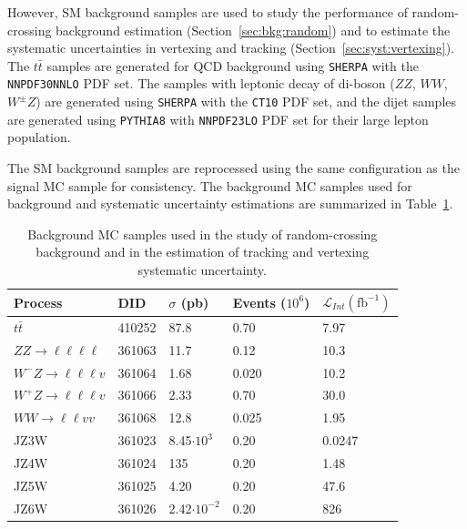 However, SM background samples are used to study the performance of random-crossing background estimation (Section~\ref{sec:bkg:random}) and to estimate the systematic uncertainties in vertexing and tracking (Section~\ref{sec:syst:vertexing}). The $t\bar{t}$ samples are generated for QCD background using \texttt{SHERPA} with the \texttt{NNPDF30NNLO} PDF set. The samples with leptonic decay of di-boson ($ZZ$, $WW$, $W^{\pm}Z$) are generated using \texttt{SHERPA} with the \texttt{CT10} PDF set, and the dijet samples are generated using \texttt{PYTHIA8} with \texttt{NNPDF23LO} PDF set for their large lepton population.

The SM background samples are reprocessed using the same configuration as the signal MC sample for consistency. The background MC samples used for background and systematic uncertainty estimations are summarized in Table~\ref{table:background_MC}.


\begin{table}[!htb]
  \centering
  \begin{tabular}{ l l l l l}
    \hline
    \hline
    Process         &   DID     &   $\sigma$ (pb)       & Events ($10^{6}$) &   $\mathcal{L}_{Int} (\mathrm{fb^{-1}})$ \\
    \hline
    $t\bar{t}$                              &   410252  &   87.8   &   0.70        &   7.97                 \\
    $ZZ\rightarrow \ell \ell \ell \ell$     &   361063  &   11.7   &   0.12        &   10.3                 \\
    $W^{-}Z\rightarrow \ell \ell \ell v$    &   361064  &   1.68   &   0.020       &   10.2                 \\
    $W^{+}Z\rightarrow \ell \ell \ell v$    &   361066  &   2.33   &   0.70        &   30.0                 \\
    $WW \rightarrow \ell \ell vv$           &   361068  &   12.8   &   0.025       &   1.95                 \\
    JZ3W                                    &   361023  &   8.45$\cdot10^{3}$      &   0.20  &   0.0247     \\
    JZ4W                                    &   361024  &   135    &   0.20        &   1.48                 \\
    JZ5W                                    &   361025  &   4.20   &   0.20        &   47.6                 \\
    JZ6W                                    &   361026  &   2.42$\cdot10^{-2}$     &   0.20  &   826        \\
    \hline
    \hline
  \end{tabular}
  \caption{Background MC samples used in the study of random-crossing background and in the estimation of tracking and vertexing systematic uncertainty.}
  \label{table:background_MC}
\end{table}
